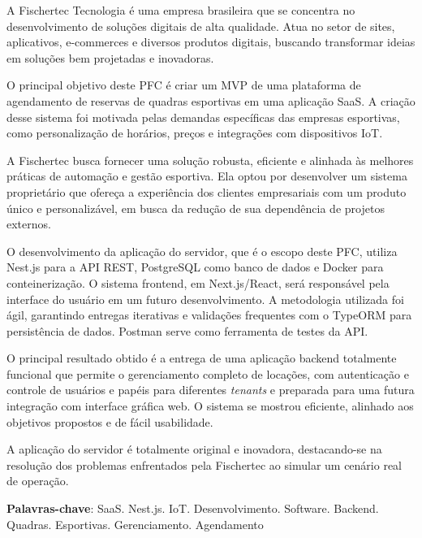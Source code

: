 \setlength{\absparsep}{18pt} %
\begin{resumo}
	\SingleSpacing
	A Fischertec Tecnologia é uma empresa brasileira que se concentra no desenvolvimento de soluções digitais de alta qualidade. Atua no setor de sites, aplicativos, e-commerces e diversos produtos digitais, buscando transformar ideias em soluções bem projetadas e inovadoras.

	O principal objetivo deste PFC é criar um \acrfull{MVP} de uma plataforma de agendamento de reservas de quadras esportivas em uma aplicação \acrfull{SaaS}. A criação desse sistema foi motivada pelas demandas específicas das empresas esportivas, como personalização de horários, preços e integrações com dispositivos \acrfull{IoT}.

	A Fischertec busca fornecer uma solução robusta, eficiente e alinhada às melhores práticas de automação e gestão esportiva. Ela optou por desenvolver um sistema proprietário que ofereça a experiência dos clientes empresariais com um produto único e personalizável, em busca da redução de sua dependência de projetos externos.

	O desenvolvimento da aplicação do servidor, que é o escopo deste PFC, utiliza Nest.js para a \acrshort{API} \acrshort{REST}, PostgreSQL como banco de dados e Docker para conteinerização. O sistema frontend, em Next.js/React, será responsável pela interface do usuário em um futuro desenvolvimento. A metodologia utilizada foi ágil, garantindo entregas iterativas e validações frequentes com o TypeORM para persistência de dados. Postman serve como ferramenta de testes da \acrshort{API}.

	O principal resultado obtido é a entrega de uma aplicação backend totalmente funcional que permite o gerenciamento completo de locações, com autenticação e controle de usuários e papéis para diferentes \textit{tenants} e preparada para uma futura integração com interface gráfica web. O sistema se mostrou eficiente, alinhado aos objetivos propostos e de fácil usabilidade.

	A aplicação do servidor é totalmente original e inovadora, destacando-se na resolução dos problemas enfrentados pela Fischertec ao simular um cenário real de operação.

	\textbf{Palavras-chave}: \acrshort{SaaS}. Nest.js. \acrshort{IoT}. Desenvolvimento. Software. Backend. Quadras. Esportivas. Gerenciamento. Agendamento
\end{resumo}

